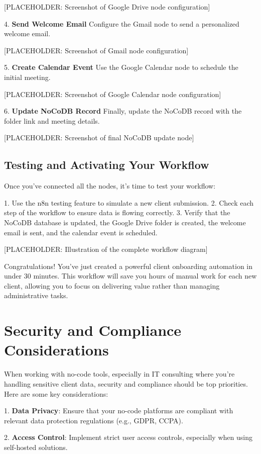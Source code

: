 [PLACEHOLDER: Screenshot of Google Drive node configuration]

4. \textbf{Send Welcome Email}
Configure the Gmail node to send a personalized welcome email.

[PLACEHOLDER: Screenshot of Gmail node configuration]

5. \textbf{Create Calendar Event}
Use the Google Calendar node to schedule the initial meeting.

[PLACEHOLDER: Screenshot of Google Calendar node configuration]

6. \textbf{Update NoCoDB Record}
Finally, update the NoCoDB record with the folder link and meeting details.

[PLACEHOLDER: Screenshot of final NoCoDB update node]

\subsection{Testing and Activating Your Workflow}

Once you've connected all the nodes, it's time to test your workflow:

1. Use the n8n testing feature to simulate a new client submission.
2. Check each step of the workflow to ensure data is flowing correctly.
3. Verify that the NoCoDB database is updated, the Google Drive folder is created, the welcome email is sent, and the calendar event is scheduled.

[PLACEHOLDER: Illustration of the complete workflow diagram]

Congratulations! You've just created a powerful client onboarding automation in under 30 minutes. This workflow will save you hours of manual work for each new client, allowing you to focus on delivering value rather than managing administrative tasks.

\section{Security and Compliance Considerations}

When working with no-code tools, especially in IT consulting where you're handling sensitive client data, security and compliance should be top priorities. Here are some key considerations:

1. \textbf{Data Privacy}: Ensure that your no-code platforms are compliant with relevant data protection regulations (e.g., GDPR, CCPA).

2. \textbf{Access Control}: Implement strict user access controls, especially when using self-hosted solutions.

